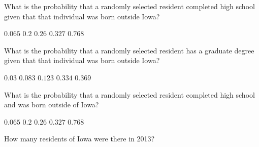 \documentclass[answers,12pt]{exam}
\begin{document}
\begin{questions}
\question What is the probability that a randomly selected
resident completed high school given that
that individual was born outside Iowa?\\
\begin{oneparchoices}
\choice $0.065$ %
\choice $0.2$ %
\correctchoice $0.26$
\choice $0.327$ %
\choice $0.768$ %
\end{oneparchoices}

\question What is the probability that a randomly selected
resident has a graduate degree given that
that individual was born outside Iowa?\\
\begin{oneparchoices}
\choice $0.03$ %
\choice $0.083$ %
\correctchoice $0.123$
\choice $0.334$ %
\choice $0.369$ %
\end{oneparchoices}

\question What is the probability that a randomly selected
resident completed high school and was born
outside of Iowa?
\begin{oneparchoices}
\correctchoice $0.065$
\choice $0.2$ %
\choice $0.26$ %
\choice $0.327$ %
\choice $0.768$ %
\end{oneparchoices}

\question How many residents of Iowa were there in 2013?
\end{questions}
\end{document}
